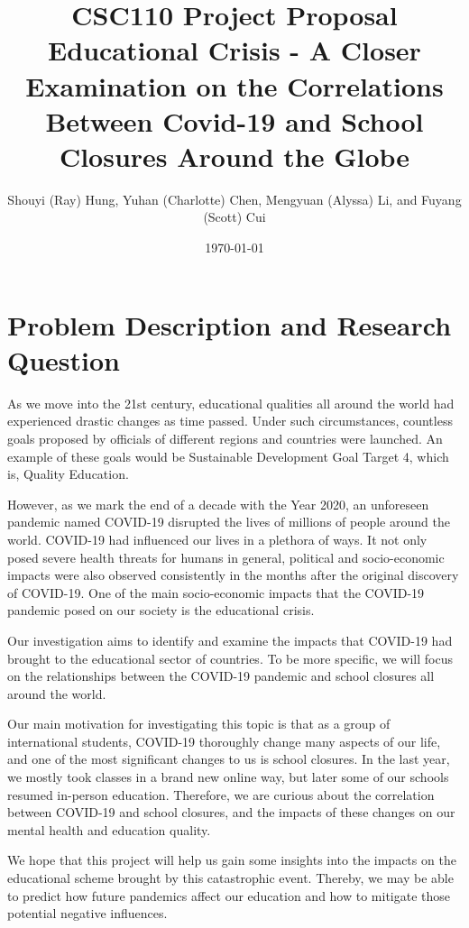 \documentclass[fontsize=11pt]{article}
\title{CSC110 Project Proposal\\ Educational Crisis - A Closer Examination on the Correlations Between Covid-19 and School Closures Around the Globe}
\author{Shouyi (Ray) Hung, Yuhan (Charlotte) Chen, Mengyuan (Alyssa) Li, and Fuyang (Scott) Cui}
\date{\today}
\begin{document}
\maketitle

\section*{Problem Description and Research Question}

As we move into the 21st century, educational qualities all around the world had experienced drastic changes as time passed. Under such circumstances, countless goals proposed by officials of different regions and countries were launched. An example of these goals would be Sustainable Development Goal Target 4, which is, Quality Education.

However, as we mark the end of a decade with the Year 2020, an unforeseen pandemic named COVID-19 disrupted the lives of millions of people around the world. COVID-19 had influenced our lives in a plethora of ways. It not only posed severe health threats for humans in general, political and socio-economic impacts were also observed consistently in the months after the original discovery of COVID-19. One of the main socio-economic impacts that the COVID-19 pandemic posed on our society is the educational crisis.

Our investigation aims to identify and examine the impacts that COVID-19 had brought to the educational sector of countries. To be more specific, we will focus on the relationships between the COVID-19 pandemic and school closures all around the world.

Our main motivation for investigating this topic is that as a group of international students, COVID-19 thoroughly change many aspects of our life, and one of the most significant changes to us is school closures. In the last year, we mostly took classes in a brand new online way, but later some of our schools resumed in-person education. Therefore, we are curious about the correlation between COVID-19 and school closures, and the impacts of these changes on our mental health and education quality.

We hope that this project will help us gain some insights into the impacts on the educational scheme brought by this catastrophic event. Thereby, we may be able to predict how future pandemics affect our education and how to mitigate those potential negative influences.

\newpage
\end{document}
